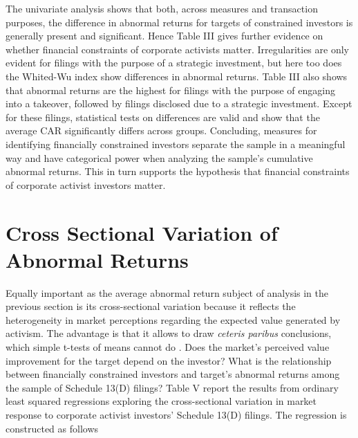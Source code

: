 \documentclass[12pt]{article}
\begin{document}
The univariate analysis shows that both, across measures and transaction purposes, the difference in abnormal returns for targets of constrained investors is generally present and significant. Hence Table III gives further evidence on whether financial constraints of corporate activists matter. Irregularities are only evident for filings with the purpose of a strategic investment, but here too does the Whited-Wu index show differences in abnormal returns. 
Table III also shows that abnormal returns are the highest for filings with the purpose of engaging into a takeover, followed by filings disclosed due to a strategic investment. Except for these filings, statistical tests on differences are valid and show that the average CAR significantly differs across groups. Concluding, measures for identifying financially constrained investors separate the sample in a meaningful way and have categorical power when analyzing the sample's cumulative abnormal returns. This in turn supports the hypothesis that financial constraints of corporate activist investors matter. 


\section{Cross Sectional Variation of Abnormal Returns}

Equally important as the average abnormal return subject of analysis in the previous section is its cross-sectional variation because it reflects the heterogeneity in market perceptions regarding the expected value generated by activism. The advantage is that it allows to draw \emph{ceteris paribus} conclusions, which simple t-tests of means cannot do \citep[p.111]{Khatami2014}. Does the market's perceived value improvement for the target depend on the investor? What is the relationship between financially constrained investors and target's abnormal returns among the sample of Schedule 13(D) filings?
Table V report the results from ordinary least squared regressions exploring the cross-sectional variation in market response to corporate activist investors' Schedule 13(D) filings. The regression is constructed as follows 
\end{document}
